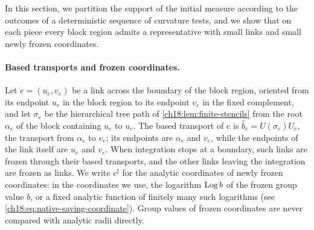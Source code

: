 In this section, we partition the support of the initial measure according to the outcomes of a deterministic sequence of curvature tests, and we show that on each piece every block region admits a representative with small links and small newly frozen coordinates.

\paragraph{Based transports and frozen coordinates.}
Let $e=(u_e,v_e)$ be a link across the boundary of the block region, oriented from its endpoint $u_e$ in the block region to its endpoint $v_e$ in the fixed complement, and let $\sigma_e$ be the hierarchical tree path of \cref{ch18:lem:finite-stencils} from the root $\alpha_e$ of the block containing $u_e$ to $u_e$. The based transport of $e$ is $\widehat b_e=U(\sigma_e)U_e$, the transport from $\alpha_e$ to $v_e$; its endpoints are $\alpha_e$ and $v_e$, while the endpoints of the link itself are $u_e$ and $v_e$. When integration stops at a boundary, such links are frozen through their based transports, and the other links leaving the integration are frozen as links. We write $c^\sharp$ for the analytic coordinates of newly frozen coordinates: in the coordinates we use, the logarithm $\operatorname{Log} b$ of the frozen group value $b$, or a fixed analytic function of finitely many such logarithms (see \eqref{ch18:eq:native-saving-coordinate}). Group values of frozen coordinates are never compared with analytic radii directly.


